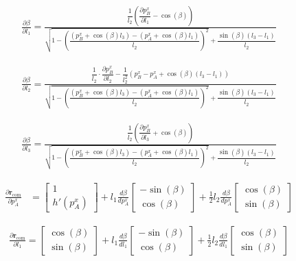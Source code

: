\documentclass[10pt]{article}
\begin{document}
\begin{align*}
\frac{\partial \beta}{\partial l_1}
= \frac{ \dfrac{1}{l_2} \left( \dfrac{\partial p_B^x}{\partial l_1} - \cos(\beta) \right) }
{ \sqrt{1 - \left( \dfrac{(p_B^x + \cos(\beta) l_3) - (p_A^x + \cos(\beta) l_1)}{l_2} \right)^2 } 
+ \dfrac{\sin(\beta)(l_3 - l_1)}{l_2} }
\end{align*}


\begin{align*}
\frac{\partial \beta}{\partial l_2}
=
\frac{
\dfrac{1}{l_2} \cdot \dfrac{\partial p_B^x}{\partial l_2}
- \dfrac{1}{l_2^2}(p_B^x - p_A^x + \cos(\beta)(l_3 - l_1))
}{
\sqrt{1 - \left( \dfrac{(p_B^x + \cos(\beta) l_3) - (p_A^x + \cos(\beta) l_1)}{l_2} \right)^2 }
+ \dfrac{\sin(\beta)(l_3 - l_1)}{l_2}
}
\end{align*}

\begin{align*}
\frac{\partial \beta}{\partial l_3}
= \frac{ \dfrac{1}{l_2} \left( \dfrac{\partial p_B^x}{\partial l_3} + \cos(\beta) \right) }
{ \sqrt{1 - \left( \dfrac{(p_B^x + \cos(\beta) l_3) - (p_A^x + \cos(\beta) l_1)}{l_2} \right)^2 } 
+ \dfrac{\sin(\beta)(l_3 - l_1)}{l_2} }
\end{align*}

\begin{align*}
\frac{\partial \mathbf{r}_{\mathrm{com}}}{\partial p_A^x} &= 
\begin{bmatrix}
1 \\
h'(p_A^x)
\end{bmatrix}
+
l_1 \frac{d\beta}{dp_A^x}
\begin{bmatrix}
- \sin(\beta) \\
\cos(\beta)
\end{bmatrix}
+
\frac{1}{2} l_2 \frac{d\beta}{dp_A^x}
\begin{bmatrix}
\cos(\beta) \\
\sin(\beta)
\end{bmatrix}
\end{align*}

\begin{align*}
\frac{\partial \mathbf{r}_{\mathrm{com}}}{\partial l_1} =
\begin{bmatrix}
\cos(\beta) \\
\sin(\beta)
\end{bmatrix}
+
l_1 \frac{d\beta}{d l_1}
\begin{bmatrix}
- \sin(\beta) \\
\cos(\beta)
\end{bmatrix}
+
\frac{1}{2} l_2 \frac{d\beta}{d l_1}
\begin{bmatrix}
\cos(\beta) \\
\sin(\beta)
\end{bmatrix}
\end{align*}
\end{document}
